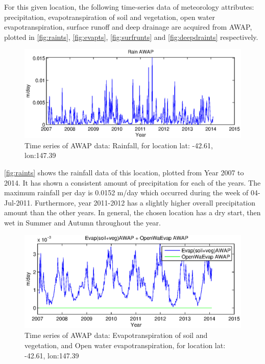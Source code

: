 \newline
For this given location, the following time-series data of meteorology attributes: precipitation, evapotranspiration of soil and vegetation, open water evapotranspiration, surface runoff and deep drainage are acquired from AWAP, plotted in \autoref{fig:raints}, \autoref{fig:evapts}, \autoref{fig:surfrunts} and \autoref{fig:deepdraints} respectively. \\
\begin{figure}[hbt]
\begin{center}
\includegraphics[width=\linewidth]{gfx/raints.eps}
\end{center}
\caption{Time series of AWAP data: Rainfall, for location lat: -42.61, lon:147.39}
\label{fig:raints}
\end{figure}
\newline
\autoref{fig:raints} shows the rainfall data of this location, plotted from Year 2007 to 2014. It has shown a consistent amount of precipitation for each of the years. The maximum rainfall per day is 0.0152 m/day which occurred during the week of 04-Jul-2011. Furthermore, year 2011-2012 has a slightly higher overall precipitation amount than the other years. In general, the chosen location has a dry start, then wet in Summer and Autumn throughout the year\citep{tasmania2013}. \\
\begin{figure}[hbt]
\begin{center}
\includegraphics[width=\linewidth]{gfx/evapts.eps}
\end{center}
\caption{Time series of AWAP data: Evapotranspiration of soil and vegetation, and Open water evapotranspiration, for location lat: -42.61, lon:147.39}
\label{fig:evapts}
\end{figure}
